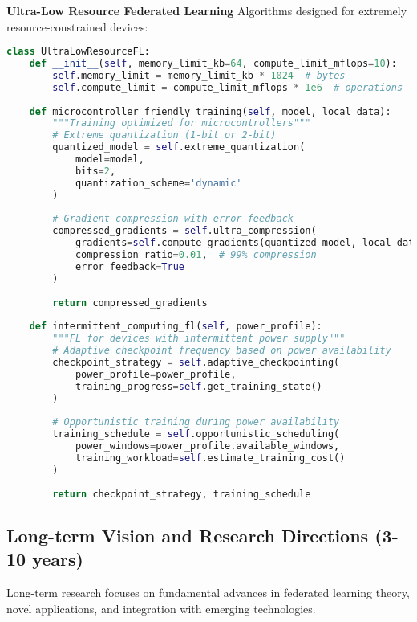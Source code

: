 \textbf{Ultra-Low Resource Federated Learning}
Algorithms designed for extremely resource-constrained devices:

\begin{lstlisting}[language=python, caption=Ultra-Low Resource FL]
class UltraLowResourceFL:
    def __init__(self, memory_limit_kb=64, compute_limit_mflops=10):
        self.memory_limit = memory_limit_kb * 1024  # bytes
        self.compute_limit = compute_limit_mflops * 1e6  # operations
        
    def microcontroller_friendly_training(self, model, local_data):
        """Training optimized for microcontrollers"""
        # Extreme quantization (1-bit or 2-bit)
        quantized_model = self.extreme_quantization(
            model=model,
            bits=2,
            quantization_scheme='dynamic'
        )
        
        # Gradient compression with error feedback
        compressed_gradients = self.ultra_compression(
            gradients=self.compute_gradients(quantized_model, local_data),
            compression_ratio=0.01,  # 99% compression
            error_feedback=True
        )
        
        return compressed_gradients
        
    def intermittent_computing_fl(self, power_profile):
        """FL for devices with intermittent power supply"""
        # Adaptive checkpoint frequency based on power availability
        checkpoint_strategy = self.adaptive_checkpointing(
            power_profile=power_profile,
            training_progress=self.get_training_state()
        )
        
        # Opportunistic training during power availability
        training_schedule = self.opportunistic_scheduling(
            power_windows=power_profile.available_windows,
            training_workload=self.estimate_training_cost()
        )
        
        return checkpoint_strategy, training_schedule
\end{lstlisting}

\subsection{Long-term Vision and Research Directions (3-10 years)}

Long-term research focuses on fundamental advances in federated learning theory, novel applications, and integration with emerging technologies.

